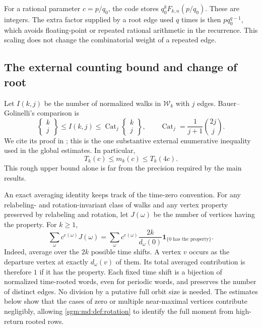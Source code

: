\documentclass[11pt,letterpaper]{article}
\theoremstyle{remark}\newtheorem{remark}[theorem]{Remark}
\newcommand{\Wc}{\mathcal W}\newcommand{\Uc}{\mathcal U}\newcommand{\Part}{\operatorname{Part}}
\newcommand{\Cat}{\operatorname{Cat}}\newcommand{\E}{\mathbb E}\newcommand{\Prob}{\mathbb P}\newcommand{\ind}{\mathbf 1}
\newcommand{\Stir}[2]{\left\{\begin{matrix}#1\\#2\end{matrix}\right\}}
\theoremstyle{definition}\newtheorem{definition}[theorem]{Definition}
\begin{document}
For a rational parameter $c=p/q_0$, the code stores
$q_0^kF_{k,n}(p/q_0)$. These are integers. The extra factor supplied
by a root edge used $q$ times is then $p q_0^{q-1}$, which avoids
floating-point or repeated rational arithmetic in the recurrence.
This scaling does not change the combinatorial weight of a repeated
edge.

\subsection{The external counting bound and change of root}

Let $I(k,j)$ be the number of normalized walks in $\Wc_k$ with $j$
edges. Bauer--Golinelli's comparison is
\begin{equation}\label{sgm:md:def:BG}
 \Stir{k}{j}\le I(k,j)\le\Cat_j\Stir{k}{j},\qquad
 \Cat_j=\frac1{j+1}\binom{2j}{j}.
\end{equation}
We cite its proof in \cite[Section 5.5]{bg}; this is
the one substantive external enumerative inequality used in the
global estimates. In particular,
\begin{equation}\label{sgm:md:def:rough}
 T_k(c)\le m_k(c)\le T_k(4c).
\end{equation}
This rough upper bound alone is far from the precision required by
the main results.

An exact averaging identity keeps track of the time-zero convention.
For any relabeling- and rotation-invariant class of walks and any
vertex property preserved by relabeling and rotation, let $J(\omega)$
be the number of vertices having the property. For $k\ge1$,
\begin{equation}\label{sgm:md:def:rotation}
 \sum_\omega c^{e(\omega)}J(\omega)
 =\sum_\omega c^{e(\omega)}
       \frac{2k}{d_\omega(0)}
       \mathbf1_{\{0\text{ has the property}\}}.
\end{equation}
Indeed, average over the $2k$ possible time shifts. A vertex $v$
occurs as the departure vertex at exactly $d_\omega(v)$ of them.
Its total averaged contribution is therefore $1$ if it has the
property. Each fixed time shift is a bijection of normalized
time-rooted words, even for periodic words, and preserves the number
of distinct edges. No division by a putative full orbit size is
needed. The estimates below show that the cases of zero or multiple
near-maximal vertices contribute negligibly, allowing
\eqref{sgm:md:def:rotation} to identify the full moment from high-return
rooted rows.

\end{document}
